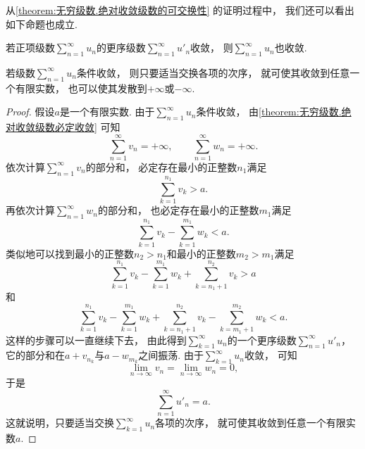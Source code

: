 从\cref{theorem:无穷级数.绝对收敛级数的可交换性} 的证明过程中，
我们还可以看出如下命题也成立.
\begin{proposition}
若正项级数\(\sum_{n=1}^\infty u_n\)的更序级数\(\sum_{n=1}^\infty u'_n\)收敛，
则\(\sum_{n=1}^\infty u_n\)也收敛.
\end{proposition}

\begin{theorem}[条件收敛级数的黎曼定理]
若级数\(\sum_{n=1}^\infty u_n\)条件收敛，
则只要适当交换各项的次序，
就可使其收敛到任意一个有限实数，
也可以使其发散到\(+\infty\)或\(-\infty\).
\begin{proof}
假设\(a\)是一个有限实数.
由于\(\sum_{n=1}^\infty u_n\)条件收敛，
由\cref{theorem:无穷级数.绝对收敛级数必定收敛} 可知\begin{equation*}
	\sum_{n=1}^\infty v_n = +\infty,
	\qquad
	\sum_{n=1}^\infty w_n = +\infty.
\end{equation*}
依次计算\(\sum_{n=1}^\infty v_n\)的部分和，
必定存在最小的正整数\(n_1\)满足\begin{equation*}
	\sum_{k=1}^{n_1} v_k > a.
\end{equation*}
再依次计算\(\sum_{n=1}^\infty w_n\)的部分和，
也必定存在最小的正整数\(m_1\)满足\begin{equation*}
	\sum_{k=1}^{n_1} v_k
	- \sum_{k=1}^{m_1} w_k
	< a.
\end{equation*}
类似地可以找到最小的正整数\(n_2>n_1\)和最小的正整数\(m_2>m_1\)满足\begin{equation*}
	\sum_{k=1}^{n_1} v_k
	- \sum_{k=1}^{m_1} w_k
	+ \sum_{k=n_1+1}^{n_2} v_k
	> a
\end{equation*}和\begin{equation*}
	\sum_{k=1}^{n_1} v_k
	- \sum_{k=1}^{m_1} w_k
	+ \sum_{k=n_1+1}^{n_2} v_k
	- \sum_{k=m_1+1}^{m_2} w_k
	< a.
\end{equation*}
这样的步骤可以一直继续下去，
由此得到\(\sum_{k=1}^\infty u_n\)的一个更序级数\(\sum_{n=1}^\infty u'_n\)，
它的部分和在\(a + v_{n_k}\)与\(a - w_{m_k}\)之间振荡.
由于\(\sum_{k=1}^\infty u_n\)收敛，
可知\begin{equation*}
	\lim_{n\to\infty} v_n
	= \lim_{n\to\infty} w_n
	= 0,
\end{equation*}
于是\begin{equation*}
	\sum_{n=1}^\infty u'_n = a.
\end{equation*}
这就说明，只要适当交换\(\sum_{k=1}^\infty u_n\)各项的次序，
就可使其收敛到任意一个有限实数\(a\).
\end{proof}
\end{theorem}

